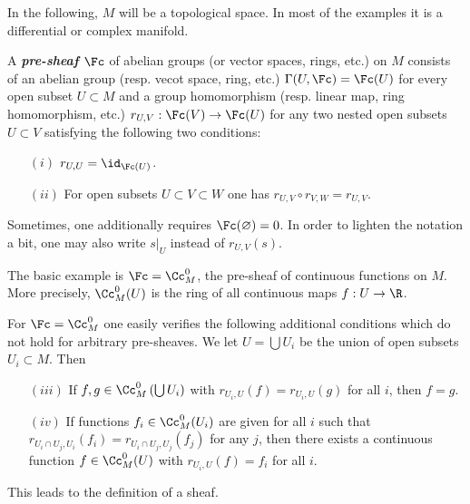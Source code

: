 In the following, $M$ will be a topological space. In most of the examples it is a differential or complex manifold.
\begin{defn}
	A \textbf{\textit{pre-sheaf $\Fc$}} of abelian groups (or vector spaces, rings, etc.) on $M$ consists of an abelian group (resp. vecot space, ring, etc.) $\Gamma(U,\Fc)=\Fc(U)$ for every open subset $U\subset M$ and a group homomorphism (resp. linear map, ring homomorphism, etc.) $r_{U,V}:\Fc(V)\to \Fc(U)$ for any two nested open subsets $U\subset V$ satisfying the following two conditions:
	\begin{enumerate}
		\item[$(i)$] $r_{U,U}=\id_{\Fc(U)}$.
		\item[$(ii)$] For open subsets $U\subset V\subset W$ one has $r_{U,V}\circ r_{V,W}=r_{U,V}$.
	\end{enumerate}
	Sometimes, one additionally requires $\Fc(\varnothing)=0$. In order to lighten the notation a bit, one may also write $s|_U$ instead of $r_{U,V}(s)$.
\end{defn}
\begin{example}
	The basic example is $\Fc=\Cc_M^0$, the pre-sheaf of continuous functions on $M$. More precisely, $\Cc_M^0(U)$ is the ring of all continuous maps $f:U\to\R$.
\end{example}
For $\Fc=\Cc_M^0$ one easily verifies the following additional conditions which do not hold for arbitrary pre-sheaves. We let $U=\bigcup U_i$ be the union of open subsets $U_i\subset M$. Then 
\begin{enumerate}
	\item[$(iii)$] If $f,g\in\Cc^0_M\left(\bigcup U_i\right)$ with $r_{U_i,U}(f)=r_{U_i,U}(g)$ for all $i$, then $f=g$.
	\item[$(iv)$] If functions $f_i\in\Cc_M^0(U_i)$ are given for all $i$ such that $r_{U_i\cap U_j,U_i}(f_i)=r_{U_i\cap U_j,U_j}(f_j)$ for any $j$, then there exists a continuous function $f\in\Cc^0_M(U)$ with $r_{U_i,U}(f)=f_i$ for all $i$.
\end{enumerate}
This leads to the definition of a sheaf.

